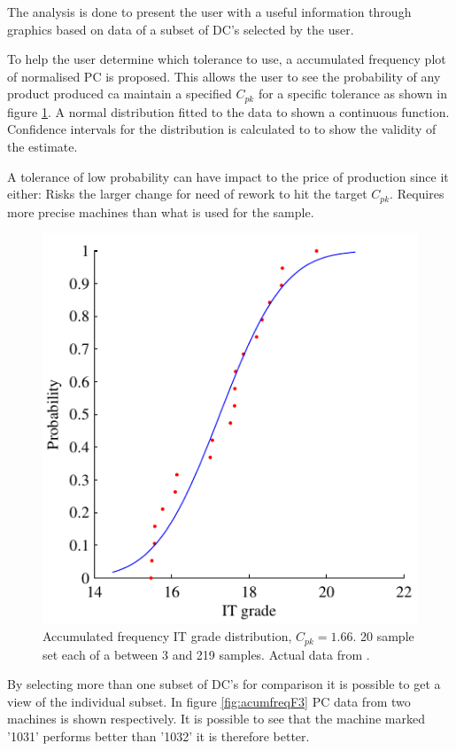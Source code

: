 \documentclass[aip,amsmath, reprint, author-year]{revtex4-1}
\begin{document}
The  analysis is done to present the user with a useful information through graphics based on data of  a subset of DC's selected by the user. 

To help the user determine which tolerance to use, a accumulated frequency plot of normalised PC is proposed. This allows the user to see the probability of any product produced ca maintain a specified $C_{pk}$ for a specific tolerance as shown in  figure \ref{fig:acumfreq}.
A normal distribution fitted to the data to shown a continuous function. Confidence intervals for the distribution is calculated to to show the validity of the estimate.

A tolerance of low probability can have impact to the price of production since it either: Risks the larger change for need of rework to hit the target $C_{pk}$. Requires more precise machines than what is used for the sample.

\begin{figure}
\includegraphics{Acum_freqIT.pdf}
\caption{\label{fig:acumfreq} Accumulated frequency IT grade distribution, $C_{pk} =1.66$. 
20 sample set each of a between 3 and 219 samples. Actual data from \cite{thornton2000use}. }
\end{figure}

By selecting more than one subset of DC's for comparison it is possible to get a view of the individual subset. In figure \ref{fig:acumfreqF3} PC data from two machines is shown respectively. It is possible to see that the machine marked '1031' performs better than '1032' it is therefore better.
\end{document}
